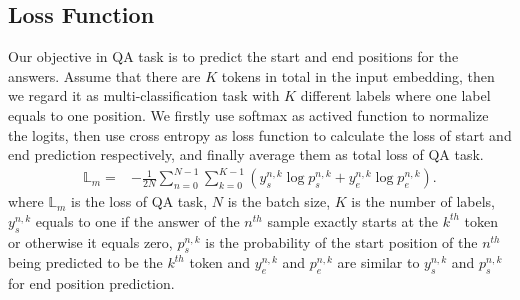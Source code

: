 \documentclass[11pt]{article}
\begin{document}
\subsection{Loss Function}\label{subsec:loss}
Our objective in QA task is to predict the start and end positions for the answers. Assume that there are $K$ tokens in total in the input embedding, then we regard it as multi-classification task with $K$ different labels where one label equals to one position. We firstly use softmax as actived function to normalize the logits, then use cross entropy as loss function to calculate the loss of start and end prediction respectively, and finally average them as total loss of QA task.
\begin{equation}\label{equation:mrc loss}
\begin{split}
\mathbb{L}_m=&-\tfrac{1}{2N}\sum_{n=0}^{N-1}\sum_{k=0}^{K-1}(y_s^{n,k}\log p_s^{n,k}+y_e^{n,k}\log p_e^{n,k}).
\end{split}
\end{equation}
where $\mathbb{L}_m$ is the loss of QA task, $N$ is the batch size, $K$ is the number of labels, $y_s^{n,k}$ equals to one if the answer of the $n^{th}$ sample exactly starts at the $k^{th}$ token or otherwise it equals zero, $p_s^{n,k}$ is the probability of the start position of the $n^{th}$ being predicted to be the $k^{th}$ token and $y_e^{n,k}$ and $p_e^{n,k}$ are similar to $y_s^{n,k}$ and $p_s^{n,k}$ for end position prediction.
\end{document}
